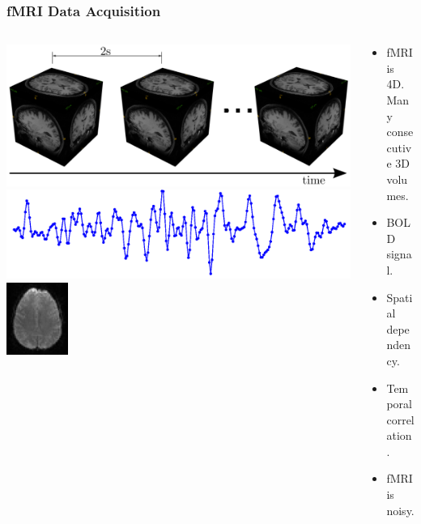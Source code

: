 \documentclass[serif]{beamer}
\begin{document}
\begin{frame}
  \frametitle{fMRI Data Acquisition}
  \begin{columns}[c]
    \begin{column}{4cm}
        \includegraphics[width=1\textwidth]{sfig/4dfmri}
        \vspace{1cm}
        \includegraphics[width=1\textwidth]{sfig/onets}
        \vspace{1cm}
        \centering
        \includegraphics[width=2cm]{sfig/rawslice}
    \end{column}

    \begin{column}{6cm}
      \begin{block}{}
        \begin{itemize}
        \item fMRI is 4D. Many consecutive 3D volumes.
        \item BOLD signal.
        \item Spatial dependency.
        \item Temporal correlation.
        \item fMRI is noisy.
        \end{itemize}
      \end{block}
    \end{column}
  \end{columns}

\end{frame}
\end{document}

